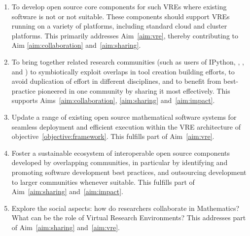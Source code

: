 \documentclass[noworkareas,deliverables,keys]{euproposal}                  %
\begin{document}
\begin{proposal}
\begin{enumerate}
\item\label{objectives:core} To develop open source core components
  for such VREs where existing software is not  or not suitable. These
  components should support VREs running on a variety of
  platforms, including standard cloud and cluster platforms. This primarily
  addresses Aim~\ref{aim:vre}, thereby contributing to Aim
  \ref{aim:collaboration} and~\ref{aim:sharing}.


\item \label{objective:community} To bring together related research
  communities (such as users of IPython, \Sage, \Singular, and \GAP)
  to symbiotically exploit overlaps in tool creation building efforts,
  to avoid duplication of effort in different disciplines, and to
  benefit from best-practice pioneered in one community by sharing it
  most effectively. This supports Aims~\ref{aim:collaboration},
  \ref{aim:sharing} and~\ref{aim:impact}.


\item \label{objective:updates} Update a range of existing open source
  mathematical software systems for seamless deployment and efficient
  execution within the VRE architecture of objective~\ref{objective:framework}.
  This fulfills part of Aim~\ref{aim:vre}.



\item \label{objective:sustainable} Foster a sustainable ecosystem of
  interoperable open source components developed by overlapping
  communities, in particular by identifying and promoting software
  development best practices, and outsourcing development to larger
  communities whenever suitable. This fulfills part of
  Aim~\ref{aim:sharing} and~\ref{aim:impact}.


\item \label{objective:social}Explore the social aspects: how do researchers collaborate in
  Mathematics? What can be the role of Virtual Research Environments?
  This addresses part of Aim~\ref{aim:sharing} and~\ref{aim:vre}.


\end{enumerate}
\end{proposal}
\end{document}
